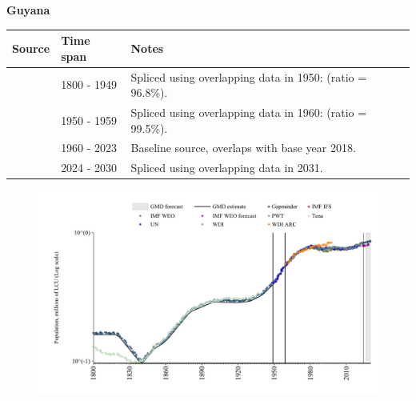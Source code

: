 \documentclass[12pt,a4paper,landscape]{article}
\begin{document}
\begin{adjustbox}{max totalsize={\paperwidth}{\paperheight},center}
\begin{minipage}[t][\textheight][t]{\textwidth}
\vspace*{0.5cm}
{}
\begin{center}
{\Large\bfseries Guyana}
\end{center}
\vspace{0.5cm}
\begin{table}[H]
\centering
\small
\begin{tabular}{|l|l|l|}
\hline
\textbf{Source} & \textbf{Time span} & \textbf{Notes} \\
\hline
\rowcolor{white}\cite{Gapminder}& 1800 - 1949 &Spliced using overlapping data in 1950: (ratio = 96.8\%).\\
\rowcolor{lightgray}\cite{IMF_IFS}& 1950 - 1959 &Spliced using overlapping data in 1960: (ratio = 99.5\%).\\
\rowcolor{white}\cite{WDI}& 1960 - 2023 &Baseline source, overlaps with base year 2018.\\
\rowcolor{lightgray}\cite{Gapminder}& 2024 - 2030 &Spliced using overlapping data in 2031.\\
\hline
\end{tabular}
\end{table}
\begin{figure}[H]
\centering
\includegraphics[width=\textwidth,height=0.6\textheight,keepaspectratio]{graphs/GUY_pop.pdf}
\end{figure}
\end{minipage}
\end{adjustbox}
\end{document}
